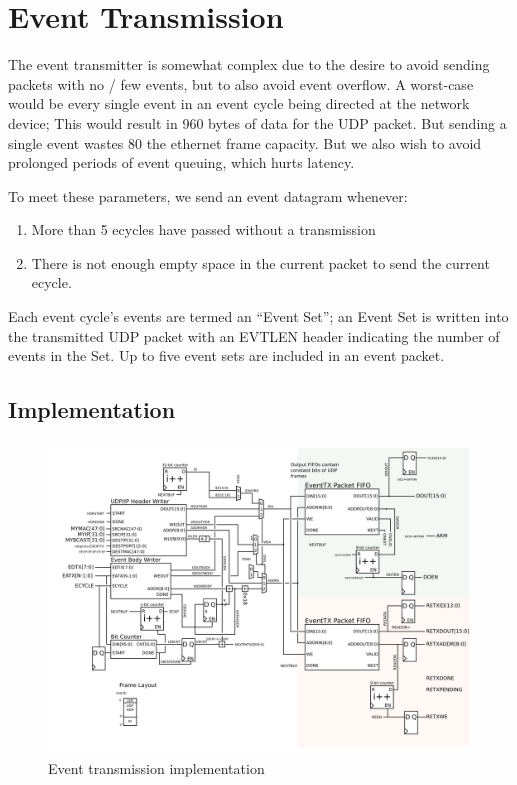 \section{Event Transmission}

The event transmitter is somewhat complex due to the desire to avoid
sending packets with no / few events, but to also avoid event
overflow. A worst-case would be every single event in an event cycle
being directed at the network device; This would result in 960 bytes
of data for the UDP packet. But sending a single event wastes 80%
the ethernet frame capacity. But we also wish to avoid prolonged
periods of event queuing, which hurts latency. 

To meet these parameters, we send an event datagram whenever: 
\begin{enumerate}
\item More than 5 ecycles have passed without a transmission
\item There is not enough empty space in the current packet to send the current ecycle. 
\end{enumerate} 

Each event cycle's events are termed an ``Event Set''; an Event Set is
written into the transmitted UDP packet with an EVTLEN header
indicating the number of events in the Set. Up to five event sets are
included in an event packet.

\subsection{Implementation}
\begin{figure}
\begin{centering}
\includegraphics[scale=0.8]{eventtx.svg}
\end{centering}
\caption{Event transmission implementation}
\label{eventtx}
\end{figure}

